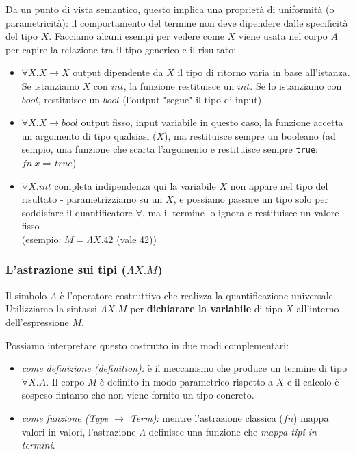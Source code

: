 \documentclass[a4paper,11pt]{report}
\begin{document}
Da un punto di vista semantico, questo implica una proprietà di uniformità (o parametricità): il comportamento del termine non deve dipendere dalle specificità del tipo $X$. Facciamo alcuni esempi per vedere come $X$ viene usata nel corpo $A$ per capire la relazione tra il tipo generico e il risultato:

\begin{itemize}
    \item  $\forall X. X \to X$ 
        \subitem output dipendente da \( X \)
    \subitem il tipo di ritorno varia in base all'istanza. Se istanziamo $X$ con $int$, la funzione restituisce un $int$. Se lo istanziamo con $bool$, restituisce un $bool$ (l'output "segue" il tipo di input)

    \item $\forall X. X \to bool$
        \subitem output fisso, input variabile
    \subitem in questo caso, la funzione accetta un argomento di tipo qualsiasi ($X$), ma restituisce sempre un booleano 
    (ad sempio, una funzione che scarta l'argomento e restituisce sempre \texttt{true}: \( fn \ x \Rightarrow true \))

\item $\forall X. int$
        \subitem completa indipendenza
        \subitem qui la variabile $X$ non appare nel tipo del risultato - parametrizziamo su un \( X \), e possiamo passare un tipo solo per soddisfare il quantificatore \( \forall \), ma il termine lo ignora e restituisce un valore fisso\\ (esempio: $M = \Lambda X. 42$ (vale 42))
\end{itemize}


\subsubsection{L'astrazione sui tipi ($\Lambda X. M$)}
Il simbolo $\Lambda$ è l'operatore costruttivo che realizza la quantificazione universale.
Utilizziamo la sintassi \( \Lambda X.M \) per \textbf{dichiarare la variabile} di tipo \( X \) all'interno dell'espressione \( M \).

Possiamo interpretare questo costrutto in due modi complementari:
\begin{itemize}
    \item \textit{come definizione (definition):} è il meccanismo che produce un termine di tipo \( \forall X.A \). Il corpo $M$ è definito in modo parametrico rispetto a $X$ e il calcolo è sospeso fintanto che non viene fornito un tipo concreto.
    \item \textit{come funzione (Type $\to$ Term):} mentre l'astrazione classica ($fn$) mappa valori in valori, l'astrazione $\Lambda$ definisce una funzione che \textit{mappa tipi in termini}.
\end{itemize}
\end{document}
